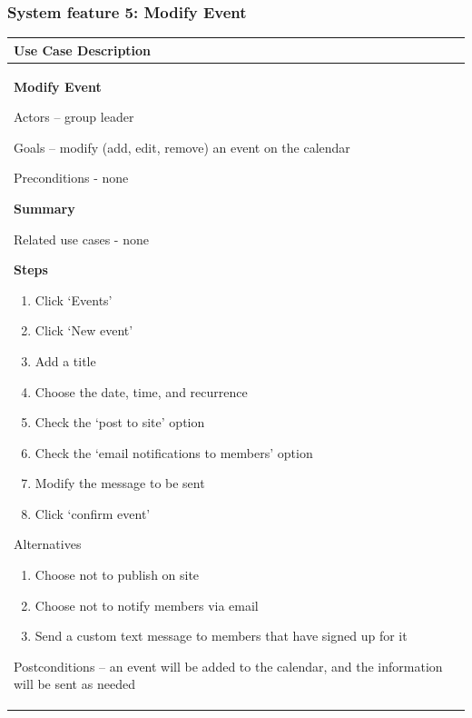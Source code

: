 \documentclass[letterpaper]{article}
\newcommand\liststyleLviii{%
\renewcommand\theenumi{\arabic{enumi}}
\renewcommand\theenumii{\alph{enumii}}
\renewcommand\theenumiii{\roman{enumiii}}
\renewcommand\theenumiv{\arabic{enumiv}}
\renewcommand\labelenumi{\theenumi.}
\renewcommand\labelenumii{\theenumii.}
\renewcommand\labelenumiii{\theenumiii.}
\renewcommand\labelenumiv{\theenumiv.}
}
\newcommand\liststyleLix{%
\renewcommand\theenumi{\arabic{enumi}}
\renewcommand\theenumii{\alph{enumii}}
\renewcommand\theenumiii{\roman{enumiii}}
\renewcommand\theenumiv{\arabic{enumiv}}
\renewcommand\labelenumi{\theenumi.}
\renewcommand\labelenumii{\theenumii.}
\renewcommand\labelenumiii{\theenumiii.}
\renewcommand\labelenumiv{\theenumiv.}
}
\begin{document}
\bigskip

\subsubsection[System feature 5: Modify Event]{\rmfamily System feature
5: Modify Event}
\begin{flushleft}
\tablehead{}
\begin{supertabular}{|m{6.42126in}|}
\hline
\bfseries\color{black} Use Case Description\\\hline
{\bfseries\color{black} Modify Event}

{\color{black} Actors -- group leader}

{\color{black} Goals -- modify (add, edit, remove) an event on the
calendar}

{\color{black} Preconditions - none}

{\bfseries\color{black} Summary}

{\color{black} Related use cases - none}

{\bfseries\color{black} Steps}

\liststyleLviii
\begin{enumerate}
\item \color{black} Click {\textquoteleft}Events{\textquoteright}\item
\color{black} Click {\textquoteleft}New event{\textquoteright}\item
\color{black} Add a title\item \color{black} Choose the date, time, and
recurrence\item \color{black} Check the {\textquoteleft}post to
site{\textquoteright} option\item \color{black} Check the
{\textquoteleft}email notifications to members{\textquoteright}
option\item \color{black} Modify the message to be sent\item
\color{black} Click {\textquoteleft}confirm
event{\textquoteright}\end{enumerate}
{\color{black} Alternatives }

\liststyleLix
\begin{enumerate}
\item \color{black} Choose not to publish on site\item \color{black}
Choose not to notify members via email\item \color{black} Send a custom
text message to members that have signed up for it\end{enumerate}
\color{black} Postconditions -- an event will be added to the calendar,
and the information will be sent as needed\\\hline
\end{supertabular}
\end{flushleft}
\end{document}
